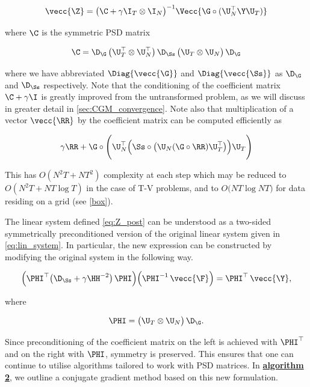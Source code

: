 \begin{equation}
    \label{eq:Z_post}
    \vecc{\Z} = \big( \C + \gamma \I_T \otimes \I_N \big) ^{-1} \Vecc{\G \circ (\U_N^\top \Y \U_T)}
\end{equation}

\noindent where $\C$ is the symmetric PSD matrix


\begin{equation}
    \label{eq:Q}
    \C = \D_{\G} \, \big(\U_T^\top \otimes \U_N^\top \big)\, \D_{\Ss} \, \big(\U_T \otimes \U_N \big) \,\D_{\G}
\end{equation}

\noindent where we have abbreviated $\Diag{\vecc{\G}}$ and $\Diag{\vecc{\Ss}}$ as $\D_{\G}$ and $\D_{\Ss}$ respectively. Note that the conditioning of the coefficient matrix $\C + \gamma \I$ is greatly improved from the untransformed problem, as we will discuss in greater detail in \cref{sec:CGM_convergence}. Note also that multiplication of a vector $\vecc{\RR}$ by the coefficient matrix can be computed efficiently as 

$$
\gamma \RR + \G \circ \Bigg(\U_N^\top \Big( \Ss \circ \big(\U_N (\G \circ \RR) \U_T^\top \big) \Big) \U_T\Bigg) 
$$

This has $O(N^2T + NT^2)$ complexity at each step which may be  reduced to $O(N^2T + NT \log T)$ in the case of T-V problems, and to $O\big(NT \log NT \big)$ for data residing on a grid (see \cref{box}). 

The linear system defined \cref{eq:Z_post} can be understood as a two-sided symmetrically preconditioned version of the original linear system given in \cref{eq:lin_system}. In particular, the new expression can be constructed by modifying the original system in the following way.

\begin{equation}
    \Big(\PHI^\top  \big(\D_{\Ss} + \gamma  \HH^{-2}\big) \, \PHI  \Big) \Big(\PHI^{-1}\, \vecc{ \F } \Big) = \PHI^\top \, \vecc{\Y},
\end{equation}

\noindent where

\begin{equation}
    \PHI =   \big(\U_T \otimes \U_N\big) \, \D_{\G}.
\end{equation}

Since preconditioning of the coefficient matrix on the left is achieved with $\PHI^\top$ and on the right with $\PHI$, symmetry is preserved. This ensures that one can continue to utilise algorithms tailored to work with PSD matrices. In \hyperlink{al2}{\textbf{algorithm 2}}, we outline a conjugate gradient method based on this new formulation. 

